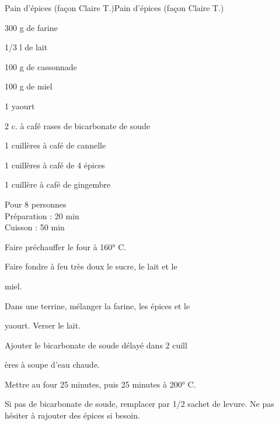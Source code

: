 \begin{recette}{Pain d'épices (façon Claire T.)}{Pain d'épices (façon Claire T.)}

\begin{ingredients}
300 g de farine\par
1/3 l de lait\par
100 g de cassonnade\par
100 g de miel\par
1 yaourt\par
2 c. à café rases de bicarbonate de soude\par
1 cuillères à café de cannelle\par
1 cuillères à café de 4 épices\par
1 cuillère à café de gingembre\par
\end{ingredients}

\begin{infos}
Pour 8 personnes\\
Préparation : 20 min\\
Cuisson : 50 min\\
\end{infos}

\begin{etapes}
\item Faire préchauffer le four à 160° C.
\item Faire fondre à feu très doux le sucre, le lait et le
\item miel.
\item Dans une terrine, mélanger la farine, les épices et le
\item yaourt. Verser le lait.
\item Ajouter le bicarbonate de soude délayé dans 2 cuill
\item ères à soupe d'eau chaude.
\item Mettre au four 25 minutes, puis 25 minutes à 200° C.
\end{etapes}

\begin{conseils}
Si pas de bicarbonate de soude, remplacer par 1/2 sachet de levure.
Ne pas hésiter à rajouter des épices si besoin.
\end{conseils}

\end{recette}
